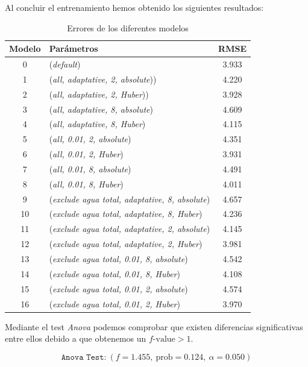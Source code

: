 \documentclass[12pt]{report} %
\begin{document}
 Al concluir el entrenamiento hemos obtenido los siguientes resultados:
\begin{table}[H]
\begin{center}
\begin{tabular}{ |c|l|c| }
    \hline
    Modelo & Parámetros & RMSE\\
    \hline
    \hline
    0 & (\textit{default})  & 3.933\\
    1 & (\textit{all, adaptative, 2, absolute}))  & 4.220\\
    2 & (\textit{all, adaptative, 2, Huber}))  & 3.928\\
    3 & (\textit{all, adaptative, 8, absolute})  & 4.609\\
    4 & (\textit{all, adaptative, 8, Huber})  & 4.115\\
    5 & (\textit{all, 0.01, 2, absolute})  & 4.351\\
    6 & (\textit{all, 0.01, 2, Huber})  & 3.931\\
    7 & (\textit{all, 0.01, 8, absolute})  & 4.491\\
    8 & (\textit{all, 0.01, 8, Huber})  & 4.011\\
    9 & (\textit{exclude agua total, adaptative, 8, absolute})  & 4.657\\
    10 &(\textit{exclude agua total, adaptative, 8, Huber})  & 4.236\\
    11 &(\textit{exclude agua total, adaptative, 2, absolute})  & 4.145\\
    12 &(\textit{exclude agua total, adaptative, 2, Huber})  & 3.981\\
    13 &(\textit{exclude agua total, 0.01, 8, absolute})  & 4.542\\
    14 &(\textit{exclude agua total, 0.01, 8, Huber})  & 4.108\\
    15 &(\textit{exclude agua total, 0.01, 2, absolute})  & 4.574\\
    16 &(\textit{exclude agua total, 0.01, 2, Huber})  & 3.970\\
    \hline
\end{tabular}
\caption{Errores de los diferentes modelos}
\end{center}
\end{table}

    Mediante el test \textit{Anova} podemos comprobar que existen diferencias significativas entre ellos debido a que obtenemos un $f\text{-value} > 1$. 

$$\texttt{Anova Test:}~(f=1.455,~\text{prob}=0.124,~\alpha=0.050)$$
\end{document}
